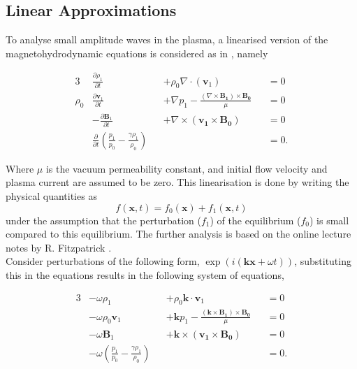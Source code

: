 \documentclass[a4paper]{article}
\numberwithin{figure}{section}
\numberwithin{equation}{section}
\begin{document}
\subsection{Linear Approximations} \label{sec:linear_approximations}

To analyse small amplitude waves in the plasma, a linearised version of the magnetohydrodynamic equations is considered as in \cite{Fitzpatricknotes}, namely

\begin{alignat}{3}
    &\frac{\partial \rho_1}{\partial t} &&+ \rho_0 \nabla  \cdot (\mathbf v_1) &&= 0 \tag{mass}\label{eq:masslin}\\
    \rho_0&\frac{\partial \mathbf v_1}{\partial t} &&+  \nabla p_1 - \frac{(\nabla \times \mathbf{B_1}) \times \mathbf{B_0}}{\mu} &&= 0 \tag{moment}\label{eq:cauchymomentlin}\\
    &-\frac{\partial \mathbf B_1}{\partial t} &&+ \nabla \times (\mathbf{v_1} \times \mathbf{B_0}) &&= 0 \tag{charge}\label{eq:faradaylin}\\
    &\frac{\partial}{\partial t}(\frac{p_1}{p_0} - \frac{\gamma\rho_1}{\rho_0}) && &&= 0 \tag{energy}\label{eq:energylin}.
\end{alignat}

Where $\mu$ is the vacuum permeability constant, and initial flow velocity and plasma current are assumed to be zero. This linearisation is done by writing the physical quantities as
\begin{equation*}
    f(\mathbf{x},t) = f_0(\mathbf{x}) + f_1(\mathbf{x},t)
\end{equation*}
under the assumption that the perturbation ($f_1$) of the equilibrium ($f_0$) is small compared to this equilibrium.
The further analysis is based on the online lecture notes by R. Fitzpatrick \cite{Fitzpatricknotes}.\\

Consider perturbations of the following form, $\exp(i(\mathbf{kx} + \omega t))$, substituting this in the equations results in the following system of equations,

\begin{alignat}{3}
    &-\omega\rho_1 &&+  \rho_0 \mathbf{k}\cdot\mathbf v_1 &&= 0 \label{eq:MHD_linear_wave_mass}\\
    &-\omega\rho_0\mathbf v_1 &&+  \mathbf{k} p_1 - \frac{(\mathbf{k} \times \mathbf{B_1}) \times \mathbf{B_0}}{\mu} &&= 0 \label{eq:MHD_linear_wave_moment}\\
    &-\omega\mathbf B_1&&+ \mathbf{k} \times (\mathbf{v_1} \times \mathbf{B_0}) &&= 0 \label{eq:MHD_linear_wave_charge}\\
    &-\omega(\frac{p_1}{p_0} - \frac{\gamma\rho_1}{\rho_0}) && &&= 0  \label{eq:MHD_linear_wave_enery}.
\end{alignat}
\end{document}
